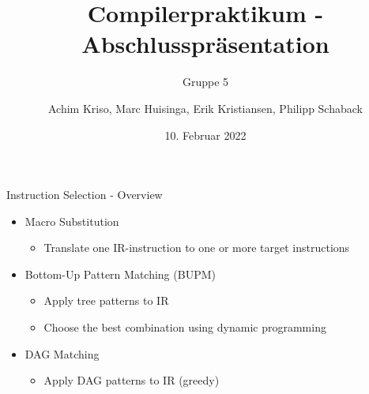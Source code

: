 \documentclass[en,16:9]{sdqbeamer}
\title[]{Compilerpraktikum - Abschlusspräsentation}
\subtitle{Gruppe 5}
\author[]{Achim Kriso, Marc Huisinga, Erik Kristiansen, Philipp Schaback}
\date[10.\,2.\,2022]{10. Februar 2022}
\begin{document}
\KITtitleframe

\begin{frame}{Instruction Selection - Overview}
	\begin{itemize}
		\item Macro Substitution
		\begin{itemize}
			\item Translate one IR-instruction to one or more target instructions
		\end{itemize}
		\vspace{1em}
		\item Bottom-Up Pattern Matching (BUPM)
		\begin{itemize}
			\item Apply tree patterns to IR
			\item Choose the best combination using dynamic programming
		\end{itemize}
		\vspace{1em}
		\item DAG Matching
		\begin{itemize}
			\item Apply DAG patterns to IR (greedy)
		\end{itemize}
	\end{itemize}
\end{frame}
\end{document}
